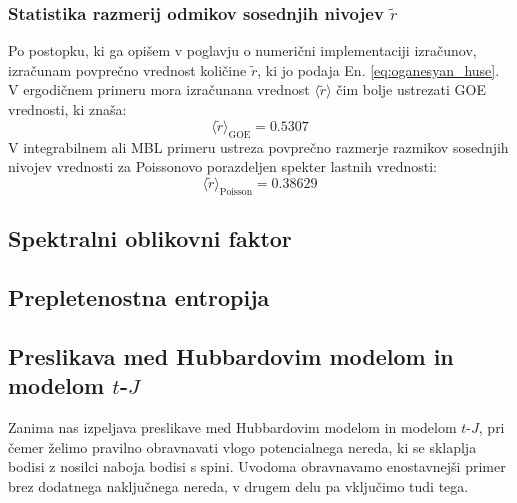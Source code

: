{ \subsection{Statistika razmerij odmikov sosednjih nivojev $\tilde{r}$}
 Po postopku, ki ga opišem v poglavju o numerični implementaciji izračunov, izračunam povprečno vrednost količine $\tilde{r}$, ki jo podaja En. \eqref{eq:oganesyan_huse}. V ergodičnem primeru mora izračunana vrednost $\langle \tilde{r}\rangle$ čim bolje ustrezati GOE vrednosti, ki znaša:
 \begin{equation}\label{eq:r_GOE}
 \langle \tilde{r}\rangle_\mathrm{GOE}=0.5307
 \end{equation}
 V integrabilnem ali MBL primeru ustreza povprečno razmerje razmikov sosednjih nivojev vrednosti za Poissonovo porazdeljen spekter lastnih vrednosti: 
 \begin{equation}\label{eq:r_poisson}
 \langle \tilde{r}\rangle_\mathrm{Poisson}=0.38629
 \end{equation}

\section{Spektralni oblikovni faktor}	
\section{Prepletenostna entropija}
\label{prepletenostna_numericno}



\cleardoublepage{}
{}




\cleardoublepage
\renewcommand\appendixname{Dodatek}
\begin{appendices}

\chapter{Preslikava med Hubbardovim modelom in modelom $t$-$J$}
\label{tj_hubb_preslikava}
Zanima nas izpeljava preslikave med Hubbardovim modelom in modelom $t$-$J$, pri čemer želimo pravilno obravnavati vlogo potencialnega nereda, ki se sklaplja bodisi z nosilci naboja bodisi s spini. Uvodoma obravnavamo enostavnejši primer brez dodatnega naključnega nereda, v drugem delu pa vključimo tudi tega. 

\end{appendices}}
